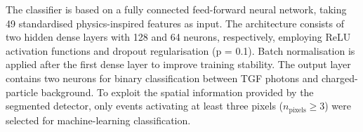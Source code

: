 \documentclass[11pt,twoside]{article}
\begin{document}
The classifier is based on a fully connected feed-forward neural network, taking 49 standardised physics-inspired features as input. The architecture consists of two hidden dense layers with 128 and 64 neurons, respectively, employing ReLU activation functions and dropout regularisation (p = 0.1). Batch normalisation is applied after the first dense layer to improve training stability. The output layer contains two neurons for binary classification between TGF photons and charged-particle background. To exploit the spatial information provided by the segmented
detector, only events activating at least three pixels
($n_{\mathrm{pixels}} \geq 3$) were selected for machine-learning classification. %

\end{document}
